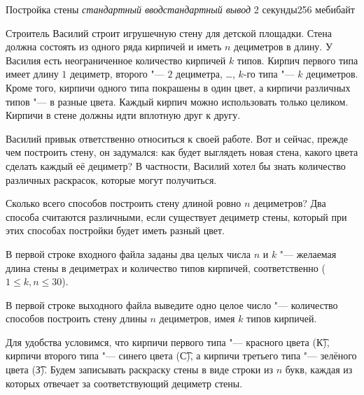 
\gdef\thisproblemauthor{Иван Казменко}
\begin{problem}{Постройка стены}
{\textsl{стандартный ввод}}{\textsl{стандартный вывод}}
{2 секунды}{256 мебибайт}{}

Строитель Василий строит игрушечную стену для детской площадки.
Стена должна состоять из одного ряда кирпичей и иметь $n$ дециметров в длину.
У Василия есть неограниченное количество кирпичей $k$ типов.
Кирпич первого типа имеет длину $1$ дециметр, второго "--- $2$ дециметра,
\ldots, $k$-го типа "--- $k$ дециметров.
Кроме того, кирпичи одного типа покрашены в один цвет,
а кирпичи различных типов "--- в разные цвета.
Каждый кирпич можно использовать только целиком.
Кирпичи в стене должны идти вплотную друг к другу.

Василий привык ответственно относиться к своей работе.
Вот и сейчас, прежде чем построить стену, он задумался:
как будет выглядеть новая стена, какого цвета сделать каждый её дециметр?
В частности, Василий хотел бы знать количество различных раскрасок,
которые могут получиться.

Сколько всего способов построить стену длиной ровно $n$ дециметров?
Два способа считаются различными, если существует дециметр стены,
который при этих способах постройки будет иметь разный цвет.

\InputFile

В первой строке входного файла заданы два целых числа $n$ и $k$ "---
желаемая длина стены в дециметрах и количество типов кирпичей, соответственно
($1 \le k, n \le 30$).

\OutputFile

В первой строке выходного файла выведите одно целое число "--- количество
способов построить стену длины $n$ дециметров, имея $k$ типов кирпичей.

\Examples

\begin{example}%
%
%
%
%
\end{example}

\Explanations

Для удобства условимся, что кирпичи первого типа "--- красного цвета (\t{К}),
кирпичи второго типа "--- синего цвета (\t{С}),
а кирпичи третьего типа "--- зелёного цвета (\t{З}).
Будем записывать раскраску стены в виде строки из $n$ букв,
каждая из которых отвечает за соответствующий дециметр стены.


\end{problem}
